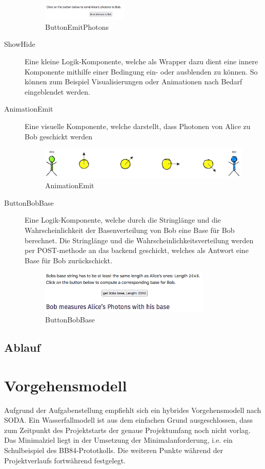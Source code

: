 \documentclass[a4paper,10.2pt,pdftex]{scrartcl}%
\begin{document}
\begin{description}
\begin{figure}[h]
	\centering
  \includegraphics[width=0.4\textwidth]{graphics/component_button_emit_photons.png}
	\caption{ButtonEmitPhotons}
\end{figure}
\item[ShowHide] Eine kleine Logik-Komponente, welche als Wrapper dazu dient eine innere Komponente mithilfe einer Bedingung ein- oder ausblenden zu können. So können zum Beispiel Visualisierungen oder Animationen nach Bedarf eingeblendet werden.
\item[AnimationEmit] Eine visuelle Komponente, welche darstellt, dass Photonen von Alice zu Bob geschickt werden
\begin{figure}[h]
	\centering
  \includegraphics[width=\textwidth]{graphics/component_animation_emit.png}
	\caption{AnimationEmit}
\end{figure}
\item[ButtonBobBase] Eine Logik-Komponente, welche durch die Stringlänge und die Wahrscheinlichkeit der Basenverteilung von Bob eine Base für Bob berechnet. Die Stringlänge und die Wahrscheinlichkeitsverteilung werden per POST-methode an das backend geschickt, welches als Antwort eine Base für Bob zurückschickt. 
\begin{figure}[h]
	\centering
  \includegraphics[width=0.8\textwidth]{graphics/component_button_bob_base.png}
	\caption{ButtonBobBase}
\end{figure}
\end{description}


\subsection{Ablauf}
\section{Vorgehensmodell}
Aufgrund der Aufgabenstellung empfiehlt sich ein hybrides Vorgehensmodell nach SODA. Ein Wasserfallmodell ist aus dem einfachen Grund ausgeschlossen, dass zum Zeitpunkt des Projektstarts der genaue Projektumfang noch nicht vorlag. Das Minimalziel liegt in der Umsetzung der Minimalanforderung, i.e. ein Schulbeispiel des BB84-Prototkolls. Die weiteren Punkte während der Projektverlaufs fortwährend festgelegt. 
\end{document}
